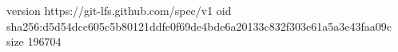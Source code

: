 version https://git-lfs.github.com/spec/v1
oid sha256:d5d54dcc605c5b80121ddfe0f69de4bde6a20133c832f303e61a5a3e43faa09c
size 196704
